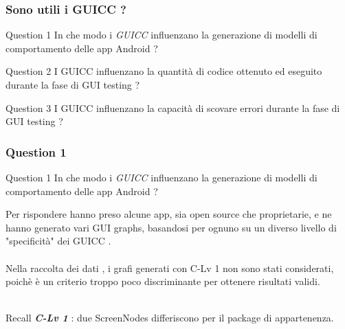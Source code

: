\documentclass[12pt]{beamer}
\begin{document}
\begin{frame}
\frametitle{Sono utili i GUICC ?}

\begin{block}{Question 1}
In che modo i \emph{GUICC} influenzano la generazione di modelli di comportamento delle app Android ?
\end{block}

\begin{block}{Question 2}
 I GUICC influenzano la quantit\`a di codice ottenuto ed eseguito durante la fase di GUI testing  ? 
\end{block}

\begin{block}{Question 3}
I GUICC influenzano la capacit\`a di scovare errori durante la fase di GUI testing ?
\end{block}


\end{frame}


\begin{frame}
\frametitle{Question 1}

\begin{block}{Question 1}
In che modo i \emph{GUICC} influenzano la generazione di modelli di comportamento delle app Android ?
\end{block}

Per rispondere hanno preso alcune app, sia open source che proprietarie, e ne hanno generato vari GUI graphs, basandosi per ognuno su un diverso livello di "specificit\`a" dei GUICC .
\\~\\

Nella raccolta dei dati , i grafi generati con C-Lv 1 non sono stati considerati, poich\`e \`e un criterio troppo poco discriminante per ottenere risultati validi.
\\~\\

\begin{block}{Recall} 
\textit{\textbf{C-Lv 1}} : due ScreenNodes differiscono per il package di appartenenza.
\end{block}
\end{frame}

\end{document}
